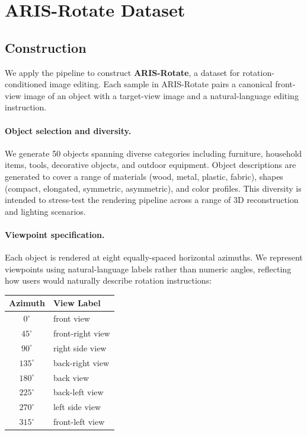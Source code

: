 \section{ARIS-Rotate Dataset}
\label{sec:dataset}

\subsection{Construction}
\label{sec:dataset:construction}

We apply the \aris{} pipeline to construct \textbf{ARIS-Rotate},
a dataset for rotation-conditioned image editing.
Each sample in ARIS-Rotate pairs a canonical front-view image of an object
with a target-view image and a natural-language editing instruction.

\paragraph{Object selection and diversity.}
We generate 50 objects spanning diverse categories including furniture, household items,
tools, decorative objects, and outdoor equipment.
Object descriptions are generated to cover a range of materials (wood, metal, plastic, fabric),
shapes (compact, elongated, symmetric, asymmetric),
and color profiles.
This diversity is intended to stress-test the rendering pipeline
across a range of 3D reconstruction and lighting scenarios.

\paragraph{Viewpoint specification.}
Each object is rendered at eight equally-spaced horizontal azimuths.
We represent viewpoints using natural-language labels rather than numeric angles,
reflecting how users would naturally describe rotation instructions:

\begin{center}
\begin{tabular}{cl}
\toprule
Azimuth & View Label \\
\midrule
$0^\circ$   & front view \\
$45^\circ$  & front-right view \\
$90^\circ$  & right side view \\
$135^\circ$ & back-right view \\
$180^\circ$ & back view \\
$225^\circ$ & back-left view \\
$270^\circ$ & left side view \\
$315^\circ$ & front-left view \\
\bottomrule
\end{tabular}
\end{center}

